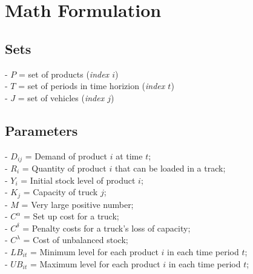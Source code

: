 \documentclass[a4paper,12pt,titlepage]{article}
\begin{document}
\section*{Math Formulation}
\subsection*{Sets}
- $P$ = set of products (\textit{index $i$})\\
- $T$ = set of periods in time horizion (\textit{index $t$})\\
- $J$ = set of vehicles (\textit{index $j$})
\subsection*{Parameters}
- $D_{ij}$ = Demand of product $i$ at time $t$;\\
- $R_i$ = Quantity of product $i$ that can be loaded in a track;\\
- $Y_i$ = Initial stock level of product $i$;\\
- $K_j$ = Capacity of truck $j$;\\
- $M$ = Very large positive number;\\
- $C^{\alpha}$ = Set up cost for a truck;\\
- $C^{\delta}$ = Penalty costs for a truck's loss of capacity;\\
- $C^{\lambda}$ = Cost of unbalanced stock;\\
- $LB_{it}$ = Minimum level for each product $i$ in each time period $t$;\\
- $UB_{it}$ = Maximum level for each product $i$ in each time period $t$;
\end{document}
